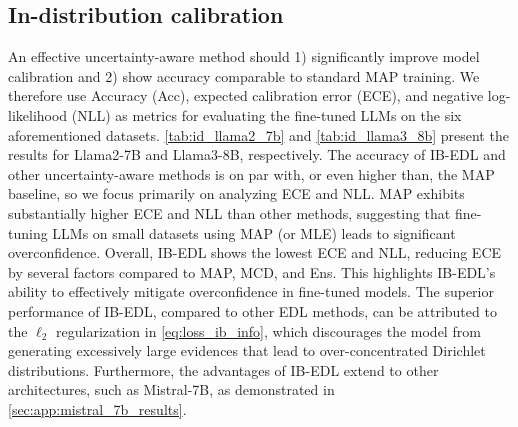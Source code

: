 \subsection{In-distribution calibration} \label{sec:exp_id_calibration}





An effective uncertainty-aware method should 1) significantly improve model calibration and 2) show accuracy comparable to standard MAP training. We therefore use Accuracy (Acc), expected calibration error (ECE), and negative log-likelihood (NLL) as metrics for evaluating the fine-tuned LLMs on the six aforementioned datasets. \cref{tab:id_llama2_7b} and \cref{tab:id_llama3_8b} present the results for Llama2-7B and Llama3-8B, respectively. The accuracy of IB-EDL and other uncertainty-aware methods is on par with, or even higher than, the MAP baseline, so we focus primarily on analyzing ECE and NLL. MAP exhibits substantially higher ECE and NLL than other methods, suggesting that fine-tuning LLMs on small datasets using MAP (or MLE) leads to significant overconfidence.  
Overall, IB-EDL shows the lowest ECE and NLL, reducing ECE by several factors compared to MAP, MCD, and Ens. This highlights IB-EDL's ability to effectively mitigate overconfidence in fine-tuned models. The superior performance of IB-EDL, compared to other EDL methods, can be attributed to the $\ell_2$ regularization in \cref{eq:loss_ib_info}, which discourages the model from generating excessively large evidences that lead to over-concentrated Dirichlet distributions. Furthermore, the advantages of IB-EDL extend to other architectures, such as Mistral-7B, as demonstrated in \cref{sec:app:mistral_7b_results}.

